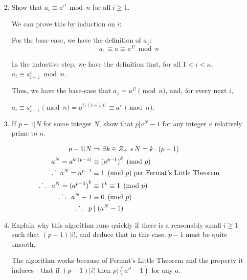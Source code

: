 \begin{problem}
\begin{enumerate}
\setcounter{enumi}{1}
\item Show that $a_i \equiv a^{i!} \bmod n$ for all $i \geq 1$.

\begin{Answer}
  We can prove this by induction on $i$:

  \noindent
  For the base case, we have the definition of $a_1$:
    \[a_{1} \equiv a \equiv a^{1!} \bmod n\]

  \noindent
  In the inductive step, we have the definition that, for all $1 < i < n$,
  $a_i \equiv a_{i-1}^i \bmod n$.

  \noindent
  Thus, we have the base-case that $a_{1} = a^{1!} \pmod n$,
  and, for every next $i$,
  
  \noindent
  $a_i \equiv a_{i-1}^{i} \pmod n = a^{{i \cdot (i-1)}!} \equiv a^{i!} \pmod n$.

\end{Answer}

\newpage
\item If $p-1 | N$ for some integer $N$, show that $p | a^N-1$ for any
integer $a$ relatively prime to $n$.

\begin{Answer}
    \begin{align*}
      p - 1 | N &\Rightarrow \exists k \in Z_{+} \backepsilon N = k \cdot (p -1) \\
      a^N = a^{k \cdot (p -1)} &\equiv {(a^{p-1})}^{k} \pmod p \\
      \dot{}\hspace{.045in}.\hspace{.045in} \dot{}\hspace{.095in} a ^N = a^{p-1} &\equiv 1 \pmod p \text{ per Fermat's Little Theorem} \\
      \dot{.\hspace{.095in}.}\hspace{.095in} a^N = {(a^{p-1})}^{k} &\equiv 1^k \equiv 1 \pmod p \\
      \dot{.\hspace{.095in}.}\hspace{.095in} a^N - 1 &\equiv 0 \pmod p \\
      \dot{.\hspace{.095in}.}\hspace{.095in} p &\;|\; (a^N - 1)
    \end{align*}
\end{Answer}

\item Explain why this algorithm runs quickly if there is a reasonably
small $i \geq 1$ such that $(p-1) | {i!}$, and  deduce that in this case,
$p-1$ must be quite smooth. 

\begin{Answer}
  The algorithm works because of Fermat's Little Theorem and the property
  it induces---that if $(p-1) | {i!}$ then $p | (a^{i!} - 1)$ for any $a$.


\end{Answer}
\end{enumerate}
\end{problem}
